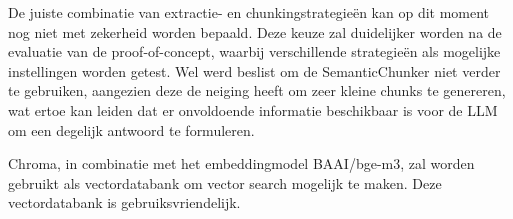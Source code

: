 De juiste combinatie van extractie- en chunkingstrategieën kan op dit moment nog niet met zekerheid worden bepaald. Deze keuze zal duidelijker worden na de evaluatie van de proof-of-concept, waarbij verschillende strategieën als mogelijke instellingen worden getest. Wel werd beslist om de SemanticChunker niet verder te gebruiken, aangezien deze de neiging heeft om zeer kleine chunks te genereren, wat ertoe kan leiden dat er onvoldoende informatie beschikbaar is voor de \acrshort{LLM} om een degelijk antwoord te formuleren.

Chroma, in combinatie met het embeddingmodel BAAI/bge-m3, zal worden gebruikt als vectordatabank om vector search mogelijk te maken. Deze vectordatabank is gebruiksvriendelijk.


